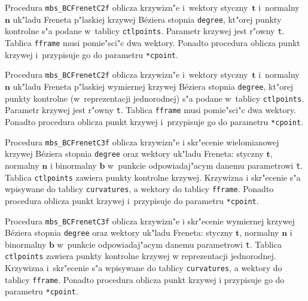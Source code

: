 \vspace{\bigskipamount}
Procedura \texttt{mbs\_BCFrenetC2f} oblicza krzywizn"e i~wektory
styczny~$\bm{t}$ i~normalny~$\bm{n}$ uk"ladu Freneta p"laskiej krzywej
B\'{e}ziera stopnia \texttt{degree}, kt"orej punkty kontrolne s"a podane
w~tablicy \texttt{ctlpoints}. Parametr krzywej jest r"owny \texttt{t}.
Tablica \texttt{fframe} musi pomie"sci"c dwa wektory. Ponadto procedura
oblicza punkt krzywej i~przypisuje go do parametru \texttt{*cpoint}.

\vspace{\bigskipamount}
Procedura \texttt{mbs\_BCFrenetC2f} oblicza krzywizn"e i~wektory
styczny~$\bm{t}$ i~normalny~$\bm{n}$ uk"ladu Freneta p"laskiej wymiernej
krzywej B\'{e}ziera stopnia \texttt{degree}, kt"orej punkty kontrolne
(w~reprezentacji jednorodnej) s"a podane w~tablicy \texttt{ctlpoints}.
Parametr krzywej jest r"owny \texttt{t}.
Tablica \texttt{fframe} musi pomie"sci"c dwa wektory. Ponadto procedura
oblicza punkt krzywej i~przypisuje go do parametru \texttt{*cpoint}.

\vspace{\bigskipamount}
Procedura \texttt{mbs\_BCFrenetC3f} oblicza krzywizn"e i skr"ecenie
wielomianowej krzywej B\'{e}ziera stopnia \texttt{degree} oraz wektory
uk"ladu Freneta: styczny $\bm{t}$, normalny $\bm{n}$ i binormalny $\bm{b}$
w~punkcie odpowiadaj"acym danemu parametrowi \texttt{t}. Tablica
\texttt{ctlpoints} zawiera punkty kontrolne krzywej. Krzywizna i
skr"ecenie s"a wpisywane do tablicy \texttt{curvatures}, a wektory do
tablicy \texttt{fframe}. Ponadto procedura oblicza punkt krzywej
i~przypisuje do parametru \texttt{*cpoint}.

\vspace{\bigskipamount}
Procedura \texttt{mbs\_BCFrenetC3f} oblicza krzywizn"e i skr"ecenie
wymiernej krzywej B\'{e}ziera stopnia \texttt{degree} oraz wektory
uk"ladu Freneta: styczny $\bm{t}$, normalny $\bm{n}$ i binormalny $\bm{b}$
w~punkcie odpowiadaj"acym danemu parametrowi \texttt{t}. Tablica
\texttt{ctlpoints} zawiera punkty kontrolne krzywej w reprezentacji
jednorodnej. Krzywizna i~skr"ecenie s"a wpisywane do tablicy
\texttt{curvatures}, a wektory do
tablicy \texttt{fframe}. Ponadto procedura
oblicza punkt krzywej i przypisuje go do parametru \texttt{*cpoint}.


